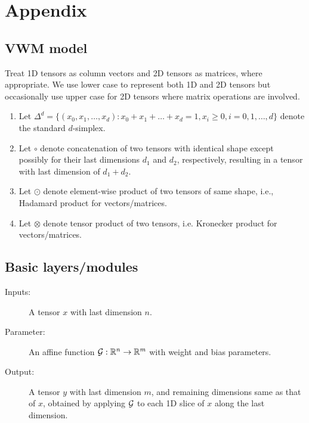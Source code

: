 \section{Appendix}



\subsection{VWM model}

\begin{notation}
	Treat 1D tensors as column vectors and 2D tensors as matrices, where appropriate.
	We use lower case to represent both 1D and 2D tensors but occasionally use upper case
	for 2D tensors where matrix operations are involved.
	
	\begin{enumerate}
		\item Let 
		$\Delta^d = \{ (x_0, x_1, \dots, x_d) : x_0 + x_1 + \dots + x_d = 1, x_i \ge 0, i = 0, 1, \dots, d\}$ denote the standard $d$-simplex.	
		
		\item  Let $\circ$ denote concatenation of two tensors with identical shape except possibly
		for their last dimensions $d_1$ and $d_2$, respectively,  
		resulting in a tensor with last dimension of $d_1+d_2$. 
		
		\item Let $\odot$ denote  element-wise product of two tensors of same shape,
		i.e., Hadamard product for vectors/matrices.
		
		\item Let $\otimes$ denote tensor product of two tensors, 
		i.e. Kronecker product for vectors/matrices.
	\end{enumerate}
\end{notation}	

\subsection{Basic layers/modules}


\begin{description}
	\item[Inputs:] A tensor $x$ with last dimension $n$.
	\item[Parameter:] An affine function $\mathcal{G}: \mathbb{R}^n \to \mathbb{R}^m$ with 
	weight and bias parameters.
	
	\item[Output:] A tensor $y$ with last dimension $m$, and remaining dimensions
	same as that of $x$, obtained by applying $\mathcal{G}$ to each 1D slice of $x$
	along the last dimension.
\end{description}


